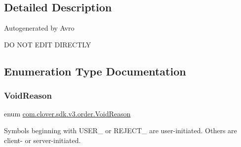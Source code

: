 \subsection{Detailed Description}
Autogenerated by Avro

DO N\+OT E\+D\+IT D\+I\+R\+E\+C\+T\+LY 

\subsection{Enumeration Type Documentation}
\mbox{\label{namespacecom_1_1clover_1_1sdk_1_1v3_1_1order_acb5aac0c1f6aeeb5b636223a69d2dec2}} 
\subsubsection{\texorpdfstring{Void\+Reason}{VoidReason}}
{\footnotesize\ttfamily enum \hyperlink{namespacecom_1_1clover_1_1sdk_1_1v3_1_1order_acb5aac0c1f6aeeb5b636223a69d2dec2}{com.\+clover.\+sdk.\+v3.\+order.\+Void\+Reason}\hspace{0.3cm}{\ttfamily [strong]}}



Symbols beginning with U\+S\+E\+R\+\_\+ or R\+E\+J\+E\+C\+T\+\_\+ are user-\/initiated. Others are client-\/ or server-\/initiated. 

